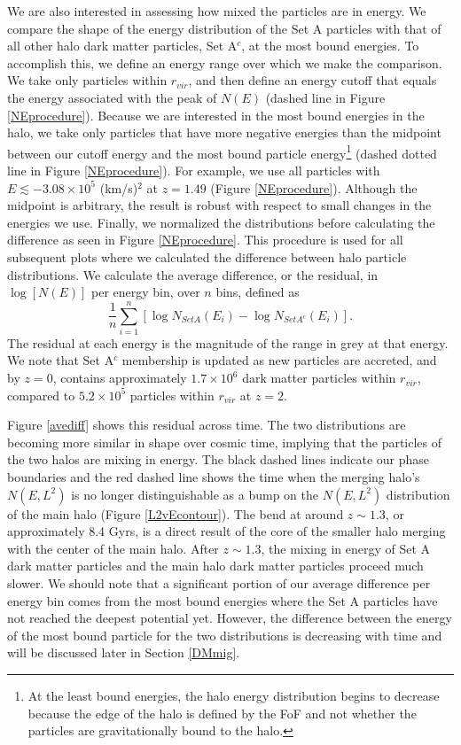 \documentclass[a4paper,11pt]{article}
\begin{document}
We are also interested in assessing how mixed the particles are in energy.  We compare the shape of the energy distribution of 
the Set A particles with that of all other halo dark matter particles, Set A$^c$, at the most bound energies.  To accomplish 
this, we define an energy range over which we make the comparison.  We take only particles within $r_{vir}$, and then define an energy 
cutoff that equals the energy associated with the peak of $N(E)$ (dashed line in Figure \ref{NEprocedure}). Because we are interested in the most bound energies in the halo, we take only particles that have 
more negative energies than the midpoint between our cutoff energy and the most bound particle energy\footnote{At the least bound 
energies, the halo energy distribution begins to decrease because the edge of the halo is defined by the FoF and 
not whether the particles are gravitationally bound to the halo.} 
(dashed dotted line in Figure \ref{NEprocedure}).  For example, we use all particles with $E\lesssim-3.08\times10^5$ (km/s)$^2$ at $z=1.49$ (Figure \ref{NEprocedure}).  
Although the midpoint is arbitrary, the result is robust with respect to small changes in the energies we use.  Finally, we normalized the distributions 
before calculating the difference as seen in Figure \ref{NEprocedure}.  This procedure is used for all subsequent plots where we calculated the difference between halo particle distributions.  
We calculate the average difference, or the residual, in $\log[N(E)]$ per energy bin, over $n$ bins, defined as 
\begin{equation}\label{diffcalc}
 \dfrac{1}{n}\sum_{i=1}^n[\log N_{Set A}(E_i)-\log N_{Set A^c}(E_i)].
\end{equation}
The residual at each energy is the magnitude of the range in grey at that energy.  We note that Set A$^c$ membership is updated as new particles 
are accreted, and by $z=0$, contains approximately $1.7\times10^6$ dark matter particles within $r_{vir}$, compared to $5.2\times10^5$ particles within 
$r_{vir}$ at $z=2$.   

Figure \ref{avediff} shows this residual across time.  The two distributions are becoming more similar in shape over cosmic time, implying that the 
particles of the two halos are mixing in energy.  The black dashed lines indicate our phase boundaries and the red dashed line 
shows the time when the merging halo's $N(E,L^2)$ is no longer distinguishable as a bump on the $N(E,L^2)$ distribution of the main halo (Figure \ref{L2vEcontour}). The 
bend at around $z\sim1.3$, or approximately 8.4 Gyrs, is a direct result of the core of the smaller halo merging with the center of the main halo.  After 
$z\sim1.3$, the mixing in energy of Set A dark matter particles and the main halo dark matter particles proceed much slower. We should note that a 
significant portion of our average difference per energy bin comes from the most bound energies where the Set A particles have not reached the deepest 
potential yet.  However, the difference between the energy of the most bound particle for the two distributions is decreasing with time and will be 
discussed later in Section \ref{DMmig}.  
\end{document}
